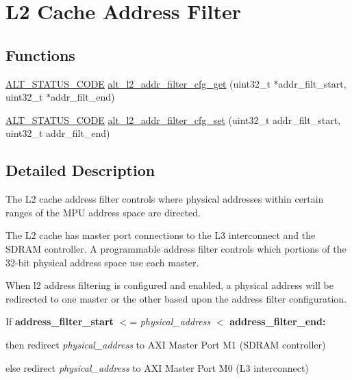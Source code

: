 \hypertarget{group__L2__ADDR__FLTR}{}\section{L2 Cache Address Filter}
\label{group__L2__ADDR__FLTR}
\subsection*{Functions}
\begin{DoxyCompactItemize}
\item 
\mbox{\hyperlink{hwlib_8h_abdb0d369f069723ca55d6c94bcaaaa12}{A\+L\+T\+\_\+\+S\+T\+A\+T\+U\+S\+\_\+\+C\+O\+DE}} \mbox{\hyperlink{group__L2__ADDR__FLTR_gac72535f2c4ed0dce395ef787a8ab47da}{alt\+\_\+l2\+\_\+addr\+\_\+filter\+\_\+cfg\+\_\+get}} (uint32\+\_\+t $\ast$addr\+\_\+filt\+\_\+start, uint32\+\_\+t $\ast$addr\+\_\+filt\+\_\+end)
\item 
\mbox{\hyperlink{hwlib_8h_abdb0d369f069723ca55d6c94bcaaaa12}{A\+L\+T\+\_\+\+S\+T\+A\+T\+U\+S\+\_\+\+C\+O\+DE}} \mbox{\hyperlink{group__L2__ADDR__FLTR_gab10c756a2e9990462a127066c015610c}{alt\+\_\+l2\+\_\+addr\+\_\+filter\+\_\+cfg\+\_\+set}} (uint32\+\_\+t addr\+\_\+filt\+\_\+start, uint32\+\_\+t addr\+\_\+filt\+\_\+end)
\end{DoxyCompactItemize}


\subsection{Detailed Description}
The L2 cache address filter controls where physical addresses within certain ranges of the M\+PU address space are directed.

The L2 cache has master port connections to the L3 interconnect and the S\+D\+R\+AM controller. A programmable address filter controls which portions of the 32-\/bit physical address space use each master.

When l2 address filtering is configured and enabled, a physical address will be redirected to one master or the other based upon the address filter configuration.

If {\bfseries{address\+\_\+filter\+\_\+start}} $<$= {\itshape physical\+\_\+address} $<$ {\bfseries{address\+\_\+filter\+\_\+end\+:}} 
\begin{DoxyItemize}
\item then redirect {\itshape physical\+\_\+address} to A\+XI Master Port M1 (S\+D\+R\+AM controller)
\item else redirect {\itshape physical\+\_\+address} to A\+XI Master Port M0 (L3 interconnect)
\end{DoxyItemize}

